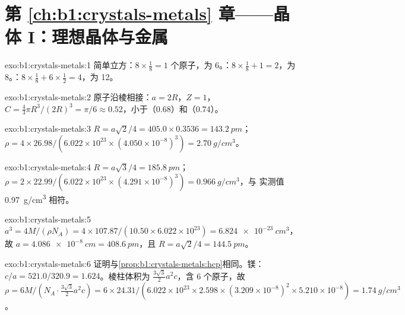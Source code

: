 \section*{第 \ref{ch:b1:crystals-metals} 章——晶体 I：理想晶体与金属}

\begin{solution}{exo:b1:crystals-metals:1}
简单立方：$8 \times \frac18 = 1$ 个原子，为 6。：$8 \times
\frac18 + 1 = 2$，为 8。：$8 \times \frac18 + 6 \times
\frac12 = 4$，为 12。
\end{solution}

\begin{solution}{exo:b1:crystals-metals:2}
原子沿棱相接：$a = 2R$，$Z = 1$，$C = \frac43\pi R^3/(2R)^3
= \pi/6 \approx 0.52$，小于（0.68）和（0.74）。
\end{solution}

\begin{solution}{exo:b1:crystals-metals:3}
$R = a\sqrt2/4 = 405.0 \times 0.3536 = \qty{143.2}{pm}$；
$\rho = 4 \times 26.98/(6.022 \times 10^{23} \times (4.050 \times
10^{-8})^3) = \qty{2.70}{g/cm^3}$。
\end{solution}

\begin{solution}{exo:b1:crystals-metals:4}
$R = a\sqrt3/4 = \qty{185.8}{pm}$；$\rho = 2 \times 22.99/(6.022 \times
10^{23} \times (4.291 \times 10^{-8})^3) = \qty{0.966}{g/cm^3}$，与
实测值 \qty{0.97}{g/cm^3} 相符。
\end{solution}

\begin{solution}{exo:b1:crystals-metals:5}
$a^3 = 4M/(\rho N_A) = 4 \times 107.87/(10.50 \times 6.022 \times 10^{23}) =
\qty{6.824e-23}{cm^3}$，故 $a = \qty{4.086e-8}{cm} = \qty{408.6}{pm}$，且
$R = a\sqrt2/4 = \qty{144.5}{pm}$。
\end{solution}

\begin{solution}{exo:b1:crystals-metals:6}
证明与\cref{prop:b1:crystals-metals:hcp}相同。镁：
$c/a = 521.0/320.9 = 1.624$。棱柱体积为
$\frac{3\sqrt3}{2}a^2c$，含 6 个原子，故 $\rho = 6M/(N_A \cdot
\frac{3\sqrt3}{2}a^2c) = 6 \times 24.31/(6.022 \times 10^{23} \times
2.598 \times (3.209 \times 10^{-8})^2 \times 5.210 \times 10^{-8}) =
\qty{1.74}{g/cm^3}$。
\end{solution}

